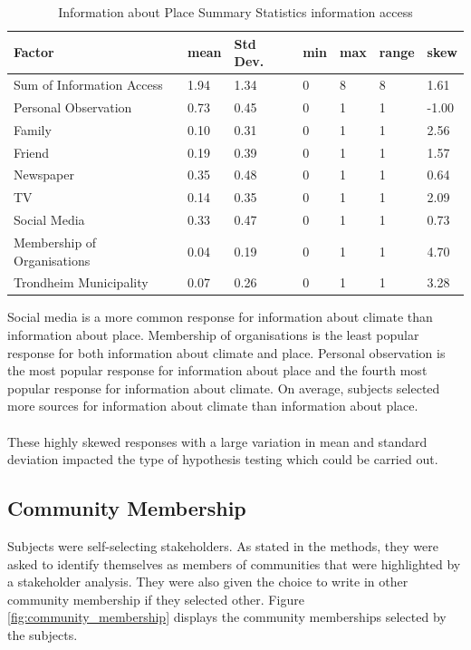 \begin{center}
\begin{table}[H]
    \centering
    \begin{tabular}{|l|l|l|l|l|l|l|}
    \hline
         \textbf{Factor} & \textbf{mean} & \textbf{Std Dev.} & \textbf{min} & \textbf{max} & \textbf{range} & \textbf{skew}  \\ \hline
        Sum of Information Access & 1.94 & 1.34 & 0 & 8 & 8 & 1.61 \\ \hline
        Personal Observation & 0.73 & 0.45 & 0 & 1 & 1 & -1.00  \\ \hline
        Family & 0.10 & 0.31 & 0 & 1 & 1 & 2.56 \\ \hline
        Friend & 0.19 & 0.39 & 0 & 1 & 1 & 1.57  \\ \hline
        Newspaper & 0.35 & 0.48 & 0 & 1 & 1 & 0.64  \\ \hline
        TV & 0.14 & 0.35 & 0 & 1 & 1 & 2.09 \\ \hline
       Social Media & 0.33 & 0.47 & 0 & 1 & 1 & 0.73  \\ \hline
        Membership of Organisations & 0.04 & 0.19 & 0 & 1 & 1 & 4.70 \\ \hline
        Trondheim Municipality & 0.07 & 0.26 & 0 & 1 & 1 & 3.28\\ \hline
                
         \end{tabular}
    \caption{Information about Place Summary Statistics information access}
\label{table:sum_stats_info__place_access}
\end{table}
\end{center}

Social media is a more common response for information about climate than information about place. Membership of organisations is the least popular response for both information about climate and place. Personal observation is the most popular response for information about place and the fourth most popular response for information about climate. On average, subjects selected more sources for information about climate than information about place. 
\paragraph{}
These highly skewed responses with a large variation in mean and standard deviation impacted the type of hypothesis testing which could be carried out.  

\subsection{Community Membership}
Subjects were self-selecting stakeholders.  As stated in the methods, they were asked to identify themselves as members of communities that were highlighted by a stakeholder analysis. They were also given the choice to write in other community membership if they selected other. Figure \ref{fig:community_membership} displays the community memberships selected by the subjects. 

